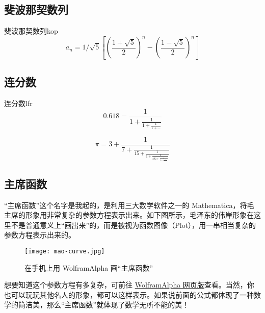 \documentclass[12pt, cn]{elegantart}
\begin{document}
\subsection{斐波那契数列}

\begin{theorem}{斐波那契数列}{kop}
	\begin{equation}
		a_{n}=1 / \sqrt{5}\left[\left(\frac{1+\sqrt{5}}{2}\right)^{n}-\left(\frac{1-\sqrt{5}}{2}\right)^{n}\right]
	\end{equation}
\end{theorem}

\subsection{连分数}
\begin{theorem}{连分数}{lfr}
	\begin{equation}
	0.618=\frac{1}{1+\frac{1}{1+\frac{1}{1+\cdots}}}
	\end{equation}

	\begin{equation}
	\pi=3+\frac{1}{7+\frac{1}{15+\frac{1}{1+\frac{1}{292+\frac{1}{1+\frac{1}{1+\ddots}}}}}}
	\end{equation}
\end{theorem}

\subsection{主席函数}

“主席函数”这个名字是我起的，是利用三大数学软件之一的 Mathematica，将毛主席的形象用非常复杂的参数方程表示出来。如下图所示，毛泽东的伟岸形象在这里不是普通意义上“画出来”的，而是被视为函数图像（Plot），用一串相当复杂的参数方程表示出来的。

\begin{figure}[h]
\centering
\texttt{[image: mao-curve.jpg]}
\caption{在手机上用 WolframAlpha 画“主席函数”}
\end{figure}

想要知道这个参数方程有多复杂，可前往 \href{https://www.wolframalpha.com/input/?i=Mao+curve}{WolframAlpha 网页版}查看。当然，你也可以玩玩其他名人的形象，都可以这样表示。如果说前面的公式都体现了一种数学的简洁美，那么“主席函数”就体现了数学无所不能的美！

\nocite{*}
{}



\clearpage

\end{document}
